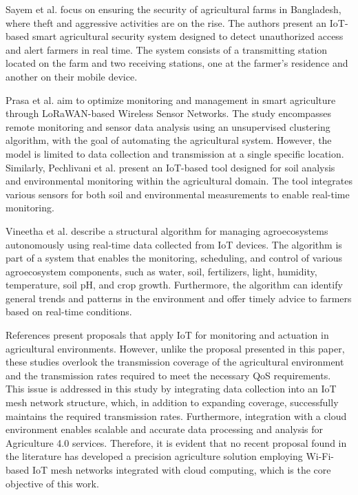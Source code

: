 \documentclass[journal]{IEEEtran}
\begin{document}
Sayem et al. \cite{SAYEM2023100358} focus on ensuring the security of agricultural farms in Bangladesh, where theft and aggressive activities are on the rise. The authors present an IoT-based smart agricultural security system designed to detect unauthorized access and alert farmers in real time. The system consists of a transmitting station located on the farm and two receiving stations, one at the farmer's residence and another on their mobile device.

Prasa et al. \cite{doi-10-1080-01430750-2021-1953591} aim to optimize monitoring and management in smart agriculture through LoRaWAN-based Wireless Sensor Networks. The study encompasses remote monitoring and sensor data analysis using an unsupervised clustering algorithm, with the goal of automating the agricultural system. However, the model is limited to data collection and transmission at a single specific location. Similarly, Pechlivani et al. \cite{mi14091698} present an IoT-based tool designed for soil analysis and environmental monitoring within the agricultural domain. The tool integrates various sensors for both soil and environmental measurements to enable real-time monitoring.

Vineetha et al. \cite{engproc2023059118} describe a structural algorithm for managing agroecosystems autonomously using real-time data collected from IoT devices. The algorithm is part of a system that enables the monitoring, scheduling, and control of various agroecosystem components, such as water, soil, fertilizers, light, humidity, temperature, soil pH, and crop growth. Furthermore, the algorithm can identify general trends and patterns in the environment and offer timely advice to farmers based on real-time conditions.

References \cite{SAYEM2023100358,doi-10-1080-01430750-2021-1953591,mi14091698,engproc2023059118} present proposals that apply IoT for monitoring and actuation in agricultural environments. However, unlike the proposal presented in this paper, these studies overlook the transmission coverage of the agricultural environment and the transmission rates required to meet the necessary QoS requirements. This issue is addressed in this study by integrating data collection into an IoT mesh network structure, which, in addition to expanding coverage, successfully maintains the required transmission rates. Furthermore, integration with a cloud environment enables scalable and accurate data processing and analysis for Agriculture 4.0 services. Therefore, it is evident that no recent proposal found in the literature has developed a precision agriculture solution employing Wi-Fi-based IoT mesh networks integrated with cloud computing, which is the core objective of this work.
\end{document}
